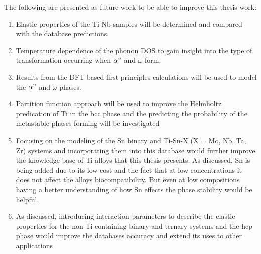 The following are presented as future work to be able to improve this thesis work:
\begin{enumerate}
	\item Elastic properties of the Ti-Nb samples will be determined and compared with the database predictions. 
	\item Temperature dependence of the phonon DOS to gain insight into the type of transformation occurring when $\alpha"$ and $\omega$ form.
	\item Results from the DFT-based first-principles calculations will be used to model the $\alpha"$ and $\omega$ phases.
	\item Partition function approach will be used to improve the Helmholtz predication of Ti in the bcc phase and the predicting the probability of the metastable phases forming will be investigated
	\item Focusing on the modeling of the Sn binary and Ti-Sn-X (X = Mo, Nb, Ta, Zr) systems and incorporating them into this database would further improve the knowledge base of Ti-alloys that this thesis presents. As discussed, Sn is being added due to its low cost and the fact that at low concentrations it does not affect the alloys biocompatibility. But even at low compositions having a better understanding of how Sn effects the phase stability would be helpful.
	\item As discussed, introducing interaction parameters to describe the elastic properties for the non Ti-containing binary and ternary systems and the hcp phase would improve the databases accuracy and extend its uses to other applications
\end{enumerate}